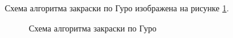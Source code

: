 \clearpage

Схема алгоритма закраски по Гуро изображена на рисунке \ref{fig:guro_alg}.

\begin{figure}[ph!]
	\caption{Схема алгоритма закраски по Гуро}
	\label{fig:guro_alg}
\end{figure}

